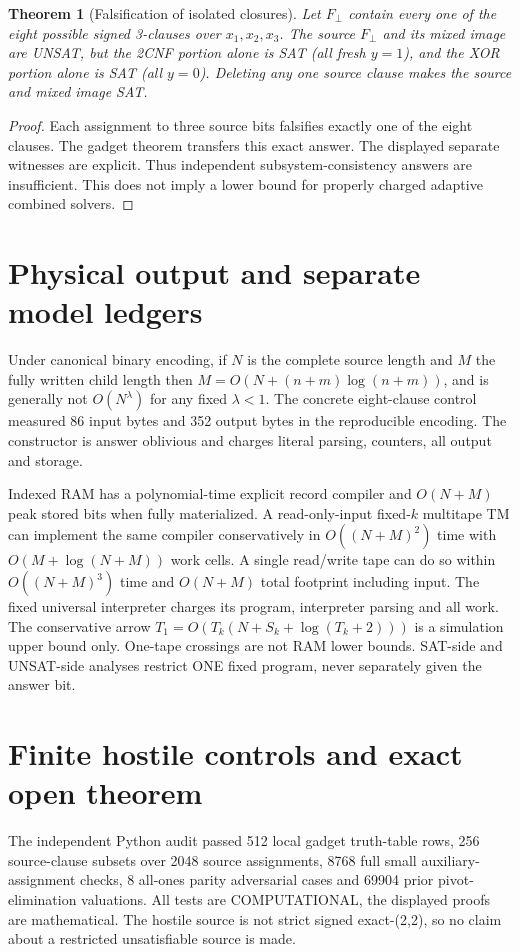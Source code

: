 \documentclass[11pt]{article}
\newtheorem{theorem}{Theorem}\newtheorem{lemma}[theorem]{Lemma}
\begin{document}
\begin{theorem}[Falsification of isolated closures]Let $F_\bot$ contain every one of the eight possible signed 3-clauses over $x_1,x_2,x_3$. The source $F_\bot$ and its mixed image are UNSAT, but the 2CNF portion alone is SAT (all fresh $y=1$), and the XOR portion alone is SAT (all $y=0$). Deleting any one source clause makes the source and mixed image SAT.
\end{theorem}
\begin{proof}Each assignment to three source bits falsifies exactly one of the eight clauses. The gadget theorem transfers this exact answer. The displayed separate witnesses are explicit. Thus independent subsystem-consistency answers are insufficient. This does not imply a lower bound for properly charged adaptive combined solvers.\end{proof}

\section{Physical output and separate model ledgers}
Under canonical binary encoding, if $N$ is the complete source length and $M$ the fully written child length then $M=O(N+(n+m)\log(n+m))$, and is generally not $O(N^\lambda)$ for any fixed $\lambda<1$. The concrete eight-clause control measured 86 input bytes and 352 output bytes in the reproducible encoding. The constructor is answer oblivious and charges literal parsing, counters, all output and storage.

Indexed RAM has a polynomial-time explicit record compiler and $O(N+M)$ peak stored bits when fully materialized. A read-only-input fixed-$k$ multitape TM can implement the same compiler conservatively in $O((N+M)^2)$ time with $O(M+\log(N+M))$ work cells. A single read/write tape can do so within $O((N+M)^3)$ time and $O(N+M)$ total footprint including input. The fixed universal interpreter charges its program, interpreter parsing and all work. The conservative arrow $T_1=O(T_k(N+S_k+\log(T_k+2)))$ is a simulation upper bound only. One-tape crossings are not RAM lower bounds. SAT-side and UNSAT-side analyses restrict ONE fixed program, never separately given the answer bit.

\section{Finite hostile controls and exact open theorem}
The independent Python audit passed 512 local gadget truth-table rows, 256 source-clause subsets over 2048 source assignments, 8768 full small auxiliary-assignment checks, 8 all-ones parity adversarial cases and 69904 prior pivot-elimination valuations. All tests are COMPUTATIONAL, the displayed proofs are mathematical. The hostile source is not strict signed exact-(2,2), so no claim about a restricted unsatisfiable source is made.
\end{document}
